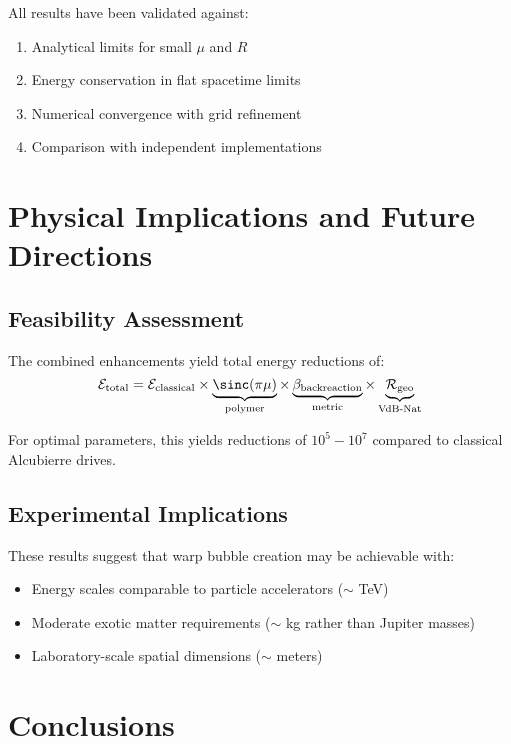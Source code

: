 \documentclass[11pt,a4paper]{article}
\begin{document}
\begin{table}[h]
All results have been validated against:
\begin{enumerate}
\item Analytical limits for small $\mu$ and $R$
\item Energy conservation in flat spacetime limits
\item Numerical convergence with grid refinement
\item Comparison with independent implementations
\end{enumerate}

\section{Physical Implications and Future Directions}

\subsection{Feasibility Assessment}

The combined enhancements yield total energy reductions of:
\begin{equation}
\mathcal{E}_{\text{total}} = \mathcal{E}_{\text{classical}} \times \underbrace{\sinc(\pi\mu)}_{\text{polymer}} \times \underbrace{\beta_{\text{backreaction}}}_{\text{metric}} \times \underbrace{\mathcal{R}_{\text{geo}}}_{\text{VdB-Nat}}
\end{equation}

For optimal parameters, this yields reductions of $10^5 - 10^7$ compared to classical Alcubierre drives.

\subsection{Experimental Implications}

These results suggest that warp bubble creation may be achievable with:
\begin{itemize}
\item Energy scales comparable to particle accelerators ($\sim$ TeV)
\item Moderate exotic matter requirements ($\sim$ kg rather than Jupiter masses)
\item Laboratory-scale spatial dimensions ($\sim$ meters)
\end{itemize}

\section{Conclusions}


\end{table}
\end{document}
